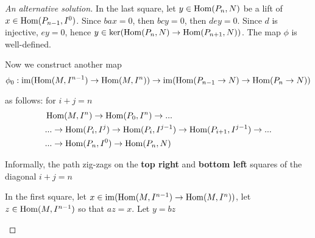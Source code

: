 \begin{proof}[An alternative solution]
	In the last square, let $y \in \operatorname{Hom}(P_n, N)$ be a lift of $x \in \operatorname{Hom}(P_{n-1}, I^0)$. Since $bax = 0$, then $bcy = 0$, then $dey = 0$. Since $d$ is injective, $ey = 0$, hence $y \in \ker (\operatorname{Hom}(P_n, N) \to \operatorname{Hom}(P_{n+1}, N))$. The map $\phi$ is well-defined.
	\begin{center}
	\end{center}

	Now we construct another map
	$$
		\phi_0: \operatorname{im} (\operatorname{Hom}(M, I^{n-1}) \to \operatorname{Hom}(M, I^n)) \to \operatorname{im}(\operatorname{Hom}(P_{n-1} \to N) \to \operatorname{Hom}(P_n \to N))
	$$
	
	as follows: for $i + j = n$
	\begin{align*}
		&\operatorname{Hom}(M, I^n) \to \operatorname{Hom}(P_0, I^n) \to ... \\
		&... \to \operatorname{Hom}(P_i, I^j) \to \operatorname{Hom}(P_i, I^{j-1}) \to \operatorname{Hom}(P_{i+1}, I^{j-1}) \to ... \\
		&... \to \operatorname{Hom}(P_n, I^0) \to \operatorname{Hom}(P_n, N)
	\end{align*}
	
	Informally, the path zig-zags on the \textbf{top right} and \textbf{bottom left} squares of the diagonal $i + j = n$
	
	In the first square, let $x \in \operatorname{im}(\operatorname{Hom}(M, I^{n-1}) \to \operatorname{Hom}(M, I^n))$, let $z \in \operatorname{Hom}(M, I^{n-1})$ so that $az = x$. Let $y = bz$
	\begin{center}
	\end{center}
	

\end{proof}
